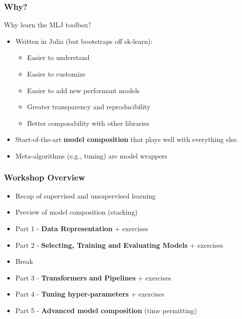 \documentclass[t]{beamer}
\newcommand\df{\bf\color{Maroon}}
\begin{document}
\begin{frame}
  \frametitle{Why?}
  \begin{block}{Why learn the MLJ toolbox?}
    \begin{itemize}
    \item Written in Julia (but bootstraps off sk-learn):\pause
      \begin{itemize}
      \item Easier to understand
      \item Easier to customize
      \item Easier to add new performant models
      \item Greater transparency and reproducibility
      \item Better composability with other libraries\pause
      \end{itemize}
    \item Start-of-the-art {\df model composition} that plays well with everything else.
    \item Meta-algorithms (e.g., tuning) are model wrappers
    \end{itemize}
  \end{block}
\end{frame}



\begin{frame}
  \frametitle{Workshop Overview}
  \begin{itemize}

  \item Recap of supervised and unsupervised learning

  \item Preview of model composition (stacking)

  \item Part 1 - {\df Data Representation} + exercises

  \item Part 2 - {\df Selecting, Training and Evaluating Models} + exercises

  \item  Break 

  \item Part 3 - {\df Transformers and Pipelines} + exercises

  \item Part 4 - {\df Tuning hyper-parameters} + exercises

  \item Part 5 - {\df Advanced model composition} (time permitting)

  \end{itemize}
\end{frame}
\end{document}
